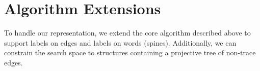 



\section{Algorithm Extensions}
To handle our representation, we extend the core algorithm described above to support labels on edges and labels on words (spines).
Additionally, we can constrain the search space to structures containing a projective tree of non-trace edges.

